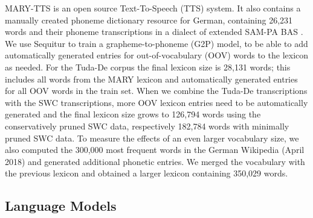 \documentclass[a4paper]{article}
\begin{document}
MARY-TTS \cite{schroder2003german} is an open source Text-To-Speech (TTS) system. It also contains a manually created phoneme dictionary resource for German, containing 26,231 words and their phoneme transcriptions in a dialect of extended SAM-PA BAS \cite{BASSAMPA}. We use Sequitur \cite{bisani2008joint} to train a grapheme-to-phoneme (G2P) model, to be able to add automatically generated entries for out-of-vocabulary (OOV) words to the lexicon as needed.
For the Tuda-De corpus the final lexicon size is 28,131 words; this includes all words from the MARY lexicon and automatically generated entries for all OOV words in the train set. When we combine the Tuda-De transcriptions with the SWC transcriptions, more OOV lexicon entries need to be automatically generated and the final lexicon size grows to 126,794 words using the conservatively pruned SWC data, respectively 182,784 words with minimally pruned SWC data. To measure the effects of an even larger vocabulary size, we also computed the 300,000 most frequent words in the German Wikipedia (April 2018) and generated additional phonetic entries. We merged the vocabulary with the previous lexicon and obtained a larger lexicon containing 350,029 words.

\subsection{Language Models}
\end{document}
